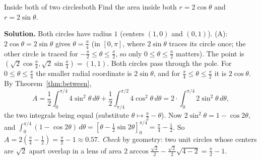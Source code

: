 \documentclass[11pt]{article}
\begin{document}
\begin{exmp}{Inside both of two circles}{both}
Find the area inside both $r=2\cos\theta$ and $r=2\sin\theta$.

\textbf{Solution.} Both circles have radius $1$ (centers $(1,0)$ and $(0,1)$). (A): $2\cos\theta=2\sin\theta$ gives $\theta=\frac\pi4$ (in $[0,\pi]$, where $2\sin\theta$ traces its circle once; the other circle is traced for $-\frac\pi2\le\theta\le\frac\pi2$, so only $0\le\theta\le\frac\pi2$ matters). The point is $\left(\sqrt2\cos\frac\pi4,\sqrt2\sin\frac\pi4\right)=(1,1)$. Both circles pass through the pole. For $0\le\theta\le\frac\pi4$ the smaller radial coordinate is $2\sin\theta$, and for $\frac\pi4\le\theta\le\frac\pi2$ it is $2\cos\theta$. By Theorem~\ref{thm:between},
\[A=\frac12\int_0^{\pi/4}4\sin^2\theta\,d\theta+\frac12\int_{\pi/4}^{\pi/2}4\cos^2\theta\,d\theta=2\cdot\int_0^{\pi/4}2\sin^2\theta\,d\theta,\]
the two integrals being equal (substitute $\theta\mapsto\frac\pi2-\theta$). Now $2\sin^2\theta=1-\cos2\theta$, and $\int_0^{\pi/4}(1-\cos2\theta)\,d\theta=\left[\theta-\frac12\sin2\theta\right]_0^{\pi/4}=\frac\pi4-\frac12$. So $A=2\left(\frac\pi4-\frac12\right)=\frac\pi2-1\approx0.57$.
\emph{Check} by geometry: two unit circles whose centers are $\sqrt2$ apart overlap in a lens of area $2\arccos\frac{\sqrt2}2-\frac{\sqrt2}2\sqrt{4-2}=\frac\pi2-1$.
\end{exmp}
\end{document}
